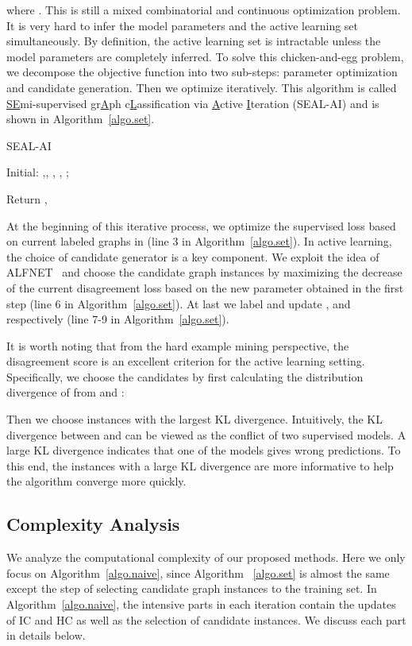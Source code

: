 \documentclass[sigconf]{acmart}
\newcommand{\eat}[1]{}
\begin{document}
where .  This is still a mixed combinatorial and continuous optimization problem.  It is very hard to infer the model parameters and the active learning set  simultaneously.  By definition, the active learning set  is intractable unless the model parameters are completely inferred.  To solve this chicken-and-egg problem, we decompose the objective function into two sub-steps: parameter optimization and candidate generation. Then we optimize  iteratively.  This algorithm is called \underline{SE}mi-supervised gr\underline{A}ph c\underline{L}assification via \underline{A}ctive \underline{I}teration (SEAL-AI) and is shown in Algorithm~\ref{algo.set}.



\begin{algorithm}[t]
  \caption{SEAL-AI}
  \label{algo.set}
Initial: ,, , , ;

  Return , \;
\end{algorithm}

At the beginning of this iterative process, we optimize the supervised loss  based on current labeled graphs in  (line 3 in Algorithm~\ref{algo.set}). In active learning, the choice of candidate generator is a key component.  We exploit the idea of ALFNET~\cite{bilgic2010active} and choose the candidate graph instances  by maximizing the decrease of the current disagreement loss based on the new parameter obtained in the first step (line 6 in Algorithm~\ref{algo.set}).  At last we label  and update ,  and  respectively (line 7-9 in Algorithm~\ref{algo.set}).  \eat{Since  and ,  Algorithm~\ref{algo.set} can converge in finite steps.}

It is worth noting that from the hard example mining perspective, the disagreement score is an excellent criterion for the active learning setting. Specifically, we choose the candidates by first calculating the distribution divergence of  from  and :

Then we choose  instances with the largest KL divergence.  Intuitively, the KL divergence between  and  can be viewed as the conflict of two supervised models.  A large KL divergence indicates that one of the models gives wrong predictions. To this end, the instances with a large KL divergence are more informative to help the algorithm converge more quickly.


\subsection{Complexity Analysis}
We analyze the computational complexity of our proposed methods.  Here we only focus on Algorithm~\ref{algo.naive}, since Algorithm ~\ref{algo.set} is almost the same except the step of selecting candidate graph instances to the training set.  In Algorithm~\ref{algo.naive}, the intensive parts in each iteration contain the updates of IC and HC as well as the selection of candidate instances. We discuss each part in details below.
\end{document}
